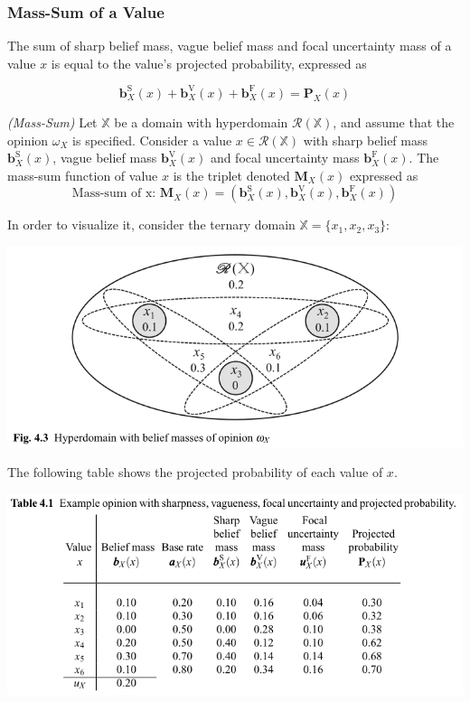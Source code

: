 \subsubsection{Mass-Sum of a Value}

The sum of sharp belief mass, vague belief mass and focal uncertainty mass of a
value $x$ is equal to the value's projected probability, expressed as

\begin{equation}
    \mathbf{b}^{\mathrm{S}}_X(x) + \mathbf{b}^{\mathrm{V}}_X(x) + \mathbf{b}^{\mathrm{F}}_X(x) = \mathbf{P}_X(x)
\end{equation}

\begin{definition}
    \emph{(Mass-Sum)} Let $\mathbb{X}$ be a domain with hyperdomain $\mathcal{R}(\mathbb{X})$, and assume that the opinion $\omega_X$ is specified. Consider a value $x \in \mathcal{R}(\mathbb{X})$ with sharp belief mass $\mathbf{b}^{\mathrm{S}}_X(x)$, vague belief mass $\mathbf{b}^{\mathrm{V}}_X(x)$ and focal uncertainty mass $\mathbf{b}^{\mathrm{F}}_X(x)$. The mass-sum function of value $x$ is the triplet denoted $\mathbf{M}_X(x)$ expressed as
    \begin{equation}
        \text{Mass-sum of x: } \mathbf{M}_X(x) = \left( \mathbf{b}^{\mathrm{S}}_X(x), \mathbf{b}^{\mathrm{V}}_X(x), \mathbf{b}^{\mathrm{F}}_X(x) \right)
    \end{equation}
\end{definition}

In order to visualize it, consider the ternary domain $\mathbb{X} = \{x_1, x_2, x_3\}$:

\includegraphics[width=\linewidth]{images/fig.4.3.png}

The following table shows the projected probability of each value of $x$.

\includegraphics[width=\linewidth]{images/tab.4.1.png}

